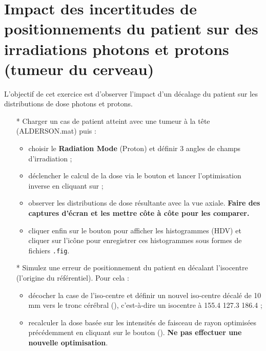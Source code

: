 \documentclass[a4paper,12pt,notitlepage]{article}	%
\begin{document}
\section{Impact des incertitudes de positionnements du patient sur des irradiations photons et protons (tumeur du cerveau)}
 
 L'objectif de cet exercice est d'observer l'impact d'un décalage du patient sur les distributions de dose photons et protons.
 
 \begin{itemize}
   \item[*] Charger un cas de patient atteint avec une tumeur à la tête (ALDERSON.mat) puis :
	\begin{itemize}
		\item choisir le \textbf{Radiation Mode} (Proton) et définir 3 angles de champs d'irradiation ;
		\item déclencher le calcul de la dose via le bouton \textbf{} et lancer l'optimisation inverse en cliquant sur \textbf{};
		\item observer les distributions de dose résultante avec la vue axiale. \textbf{Faire des captures d'écran et les mettre côte à côte pour les comparer.}
		\item cliquer enfin sur le bouton \textbf{} pour afficher les histogrammes  (HDV) et cliquer sur l'icône  pour enregistrer ces histogrammes sous formes de fichiers \texttt{.fig}. 
	\end{itemize}
	\item[*] Simulez une erreur de positionnement du patient en décalant l'isocentre (l'origine du référentiel). Pour cela :
	\begin{itemize}
		\item décocher la case  de l'iso-centre et définir un nouvel iso-centre décalé de 10 mm vers le tronc cérébral (), c'est-à-dire un isocentre à 155.4 127.3 186.4 ;
		\item recalculer la dose basée sur les intensités de faisceau de rayon optimisées précédemment en cliquant sur le bouton (). \textbf{Ne pas effectuer une nouvelle optimisation}. 
	\end{itemize}
 \end{itemize}
\end{document}

